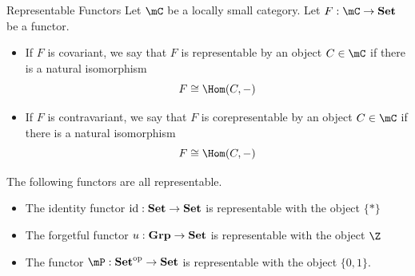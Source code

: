 \documentclass[a4paper]{article}
\begin{document}
\begin{defn}{Representable Functors}{} Let $\mC$ be a locally small category. Let $F:\mC\to\bold{Set}$ be a functor. 
\begin{itemize}
\item If $F$ is covariant, we say that $F$ is representable by an object $C\in\mC$ if there is a natural isomorphism $$F\cong\Hom(C,-)$$
\item If $F$ is contravariant, we say that $F$ is corepresentable by an object $C\in\mC$ if there is a natural isomorphism $$F\cong\Hom(C,-)$$
\end{itemize}
\end{defn}

\begin{prp}{}{} The following functors are all representable. 
\begin{itemize}
\item The identity functor $\text{id}:\bold{Set}\to\bold{Set}$ is representable with the object $\{\ast\}$
\item The forgetful functor $u:\bold{Grp}\to\bold{Set}$ is representable with the object $\Z$
\item The functor $\mP:\bold{Set}^\text{op}\to\bold{Set}$ is representable with the object $\{0,1\}$. 
\end{itemize}
\end{prp}
\end{document}
